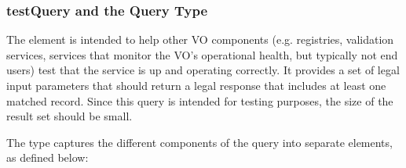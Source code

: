 \documentclass[11pt,a4paper]{ivoa} 
\begin{document}
\subsubsection{testQuery and the Query Type}

The  element is intended to help other VO components
(e.g.  registries, validation services, services that monitor the VO's
operational health, but typically not end users) test that the service
is up and operating correctly. It provides a set of legal input
parameters that should return a legal response that includes at least
one matched record. Since this query is intended for testing purposes,
the size of the result set should be small.

The  type captures the different components of the query
into separate elements, as defined below:
\end{document}
